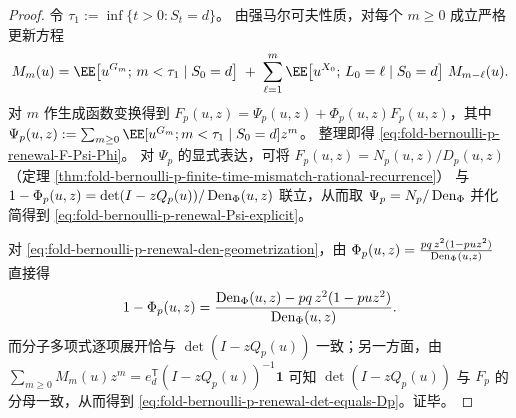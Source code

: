 \begin{proof}
令 \(\tau_1:=\inf\{t>0:S_t=d\}\)。
由强马尔可夫性质，对每个 \(m\ge 0\) 成立严格更新方程
\[
M_m(u)=\EE\!\left[u^{G_m};\,m<\tau_1\mid S_0=d\right]
\;+\;\sum_{\ell=1}^{m}\EE\!\left[u^{X_0};\,L_0=\ell\mid S_0=d\right]\,M_{m-\ell}(u).
\]
对 \(m\) 作生成函数变换得到
\(
F_p(u,z)=\Psi_p(u,z)+\Phi_p(u,z)F_p(u,z)
\)，其中
\(
\Psi_p(u,z):=\sum_{m\ge 0}\EE[u^{G_m};m<\tau_1\mid S_0=d]z^m
\)。
整理即得 \eqref{eq:fold-bernoulli-p-renewal-F-Psi-Phi}。
对 \(\Psi_p\) 的显式表达，可将
\(
F_p(u,z)=N_p(u,z)/D_p(u,z)
\)（定理 \ref{thm:fold-bernoulli-p-finite-time-mismatch-rational-recurrence}）
与
\(
1-\Phi_p(u,z)=\det(I-zQ_p(u))/\operatorname{Den}_\Phi(u,z)
\)
联立，从而取 \(\Psi_p=N_p/\operatorname{Den}_\Phi\) 并化简得到 \eqref{eq:fold-bernoulli-p-renewal-Psi-explicit}。

对 \eqref{eq:fold-bernoulli-p-renewal-den-geometrization}，由 \(\Phi_p(u,z)=\frac{p q\,z^2(1-pu z^2)}{\operatorname{Den}_\Phi(u,z)}\) 直接得
\[
1-\Phi_p(u,z)=\frac{\operatorname{Den}_\Phi(u,z)-p q\,z^2(1-pu z^2)}{\operatorname{Den}_\Phi(u,z)}.
\]
而分子多项式逐项展开恰与 \(\det(I-zQ_p(u))\) 一致；另一方面，由 \(\sum_{m\ge0}M_m(u)z^m=e_d^{\mathsf T}(I-zQ_p(u))^{-1}\mathbf 1\) 可知
\(\det(I-zQ_p(u))\) 与 \(F_p\) 的分母一致，从而得到 \eqref{eq:fold-bernoulli-p-renewal-det-equals-Dp}。证毕。
\end{proof}

